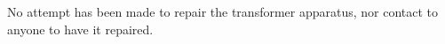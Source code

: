 \documentclass[a4paper,12pt]{article}
\begin{document}
                                                                                                                                                                                                                                                                                                                                                                                                                                                                                                                                                                                                                                                                                                                                                                                                                                                                                                                                                                                                                                                                                                                                                                                                                                                                                                                                                                                                                                                                                                                                                                                                                                                                                  No attempt has been made to repair the transformer apparatus, nor contact to anyone to have it repaired.
\end{document}
